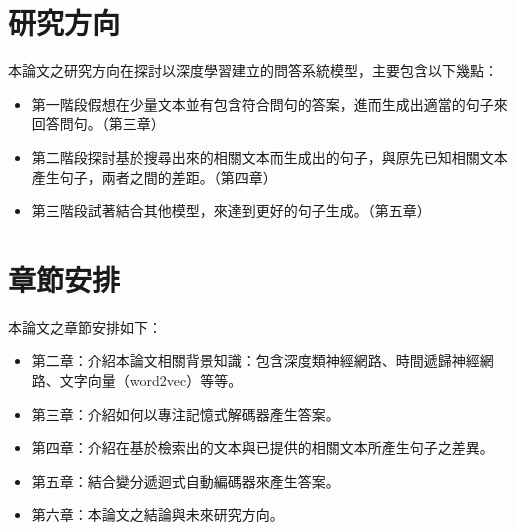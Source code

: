 \section{研究方向}
本論文之研究方向在探討以深度學習建立的問答系統模型，主要包含以下幾點：
\itemsep -2pt
\begin{itemize}
    \item 第一階段假想在少量文本並有包含符合問句的答案，進而生成出適當的句子來回答問句。（第三章）
    \item 第二階段探討基於搜尋出來的相關文本而生成出的句子，與原先已知相關文本產生句子，兩者之間的差距。（第四章）
    \item 第三階段試著結合其他模型，來達到更好的句子生成。（第五章）
\end{itemize}

\section{章節安排}
本論文之章節安排如下：
\begin{itemize}
\itemsep -2pt
    \item 第二章：介紹本論文相關背景知識：包含深度類神經網路、時間遞歸神經網路、文字向量（word2vec）等等。
    \item 第三章：介紹如何以專注記憶式解碼器產生答案。
    \item 第四章：介紹在基於檢索出的文本與已提供的相關文本所產生句子之差異。%
    \item 第五章：結合變分遞迴式自動編碼器來產生答案。
    \item 第六章：本論文之結論與未來研究方向。
\end{itemize}
